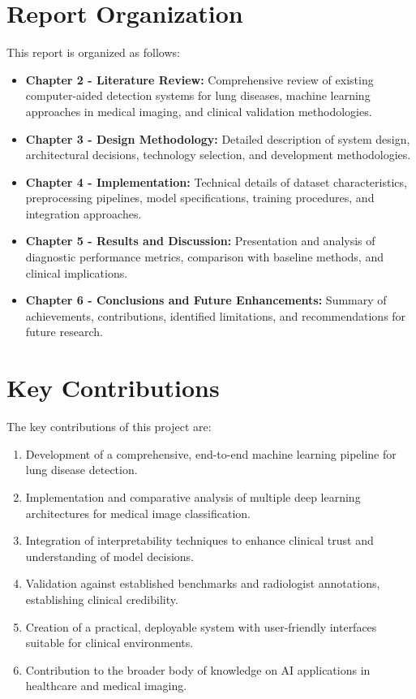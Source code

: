 {\section{Report Organization}

This report is organized as follows:

\begin{itemize}
    \item \textbf{Chapter 2 - Literature Review:} Comprehensive review of existing computer-aided detection systems for lung diseases, machine learning approaches in medical imaging, and clinical validation methodologies.
    \item \textbf{Chapter 3 - Design Methodology:} Detailed description of system design, architectural decisions, technology selection, and development methodologies.
    \item \textbf{Chapter 4 - Implementation:} Technical details of dataset characteristics, preprocessing pipelines, model specifications, training procedures, and integration approaches.
    \item \textbf{Chapter 5 - Results and Discussion:} Presentation and analysis of diagnostic performance metrics, comparison with baseline methods, and clinical implications.
    \item \textbf{Chapter 6 - Conclusions and Future Enhancements:} Summary of achievements, contributions, identified limitations, and recommendations for future research.
\end{itemize}

\section{Key Contributions}

The key contributions of this project are:

\begin{enumerate}
    \item Development of a comprehensive, end-to-end machine learning pipeline for lung disease detection.
    \item Implementation and comparative analysis of multiple deep learning architectures for medical image classification.
    \item Integration of interpretability techniques to enhance clinical trust and understanding of model decisions.
    \item Validation against established benchmarks and radiologist annotations, establishing clinical credibility.
    \item Creation of a practical, deployable system with user-friendly interfaces suitable for clinical environments.
    \item Contribution to the broader body of knowledge on AI applications in healthcare and medical imaging.
\end{enumerate}

}
